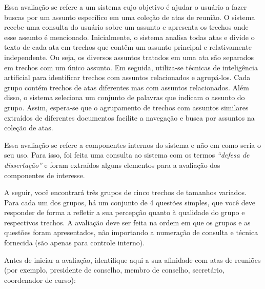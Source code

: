 
Essa avaliação se refere a um sistema cujo objetivo é ajudar o usuário a fazer buscas por um assunto específico em uma coleção de atas de reunião. O sistema recebe uma consulta do usuário sobre um assunto e apresenta os trechos onde esse assunto é mencionado. Inicialmente, o sistema analisa todas atas e divide o texto de cada ata em trechos que contêm um assunto principal e relativamente independente. Ou seja, os diversos assuntos tratados em uma ata são separados em trechos com um único assunto. Em seguida, utiliza-se técnicas de inteligência artificial para identificar trechos com assuntos relacionados e agrupá-los. Cada grupo contém trechos de atas diferentes mas com assuntos relacionados. Além disso, o sistema seleciona um conjunto de palavras que indicam o assunto do grupo. Assim, espera-se que o agrupamento de trechos com assuntos similares extraídos de diferentes documentos facilite a navegação e busca por assuntos na coleção de atas.

Essa avaliação se refere a componentes internos do sistema e não em como seria o seu uso. Para isso, foi feita uma consulta ao sistema com os termos \textit{``defesa de dissertação''} e foram extraídos 
%
%
alguns elementos 
para a avaliação dos componentes de interesse.

A seguir, você encontrará três grupos de cinco trechos de tamanhos variados. Para cada um dos grupos, há um conjunto de 4 questões simples, que você deve responder de forma a refletir a sua percepção quanto à qualidade do grupo e respectivos trechos. A avaliação deve ser feita na ordem em que os grupos e as questões foram apresentados, não importando a numeração de consulta e técnica fornecida (são apenas para controle interno).

\vspace{2em}

Antes de iniciar a avaliação, identifique aqui a sua afinidade com atas de reuniões (por exemplo, presidente de conselho, membro de conselho, secretário, coordenador de curso):







